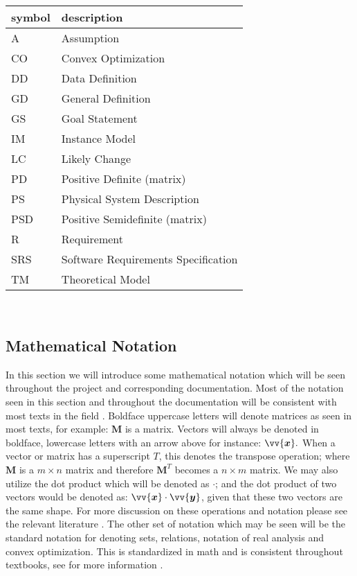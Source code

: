 \documentclass[12pt]{article}
\begin{document}
\renewcommand{\arraystretch}{1.2}
\begin{tabular}{l l} 
  \toprule		
  \textbf{symbol} & \textbf{description}\\
  \midrule 
  A & Assumption\\
  CO & Convex Optimization\\
  DD & Data Definition\\
  GD & General Definition\\
  GS & Goal Statement\\
  IM & Instance Model\\
  LC & Likely Change\\
  PD & Positive Definite (matrix)\\
  PS & Physical System Description\\
  PSD & Positive Semidefinite (matrix)\\
  R & Requirement\\
  SRS & Software Requirements Specification\\
  TM & Theoretical Model\\
  \bottomrule
\end{tabular}\\


\subsection{Mathematical Notation}
 In this section we will introduce some mathematical notation which will be seen throughout the project and corresponding documentation. Most of the notation seen in this section and throughout the documentation will be consistent with most texts in the field \citep{strang09}. Boldface uppercase letters will denote matrices as seen in most texts, for example: $\mathbf{M}$ is a matrix. Vectors will always be denoted in boldface, lowercase letters with an arrow above for instance: $\vv{\bm{x}}.$ When a vector or matrix has a superscript $T$, this denotes the transpose operation; where $\mathbf{M}$ is a $m \times n$ matrix and therefore $\mathbf{M}^T$ becomes a $n \times m$ matrix. We may also utilize the dot product which will be denoted as $\cdot$; and the dot product of two vectors would be denoted as: $\vv{\bm{x}} \cdot \vv{\bm{y}}$, given that these two vectors are the same shape. For more discussion on these operations and notation please see the relevant literature \citep{strang09}. The other set of notation which may be seen will be the standard notation for denoting sets, relations, notation of real analysis and convex optimization. This is standardized in math and is consistent throughout textbooks, see for more information \citep{Boyd2005ConvexO,Hnig1972RealA,Press2002NumericalRI}.
\end{document}
